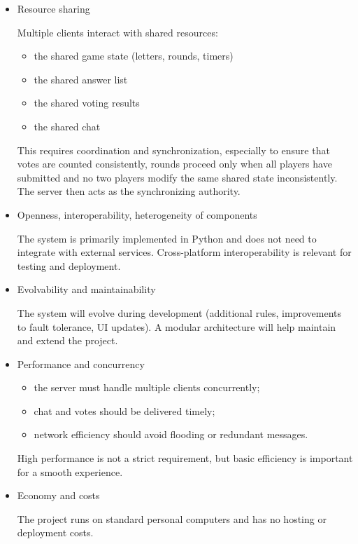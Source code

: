 \documentclass{scrartcl}
\begin{document}
\begin{itemize}
  \item Resource sharing
  
    Multiple clients interact with shared resources:
    \begin{itemize}
      \item the shared game state (letters, rounds, timers)
      \item the shared answer list
      \item the shared voting results
      \item the shared chat
    \end{itemize}
    This requires coordination and synchronization, especially to ensure that
    votes are counted consistently, rounds proceed only when all players have submitted and no two players modify the same shared state inconsistently.
    The server then acts as the synchronizing authority.
  
  \item Openness, interoperability, heterogeneity of components
  
    The system is primarily implemented in Python and does not need to integrate with external services.
    Cross-platform interoperability is relevant for testing and deployment.

  \item Evolvability and maintainability
  
    The system will evolve during development (additional rules, improvements to fault tolerance, UI updates).
    A modular architecture will help maintain and extend the project.

  \item Performance and concurrency
    \begin{itemize}
      \item the server must handle multiple clients concurrently;
      \item chat and votes should be delivered timely;
      \item network efficiency should avoid flooding or redundant messages.
    \end{itemize}
    High performance is not a strict requirement, but basic efficiency is important for a smooth experience.  

  \item Economy and costs
  
    The project runs on standard personal computers and has no hosting or deployment costs.
    
\end{itemize}
\end{document}
